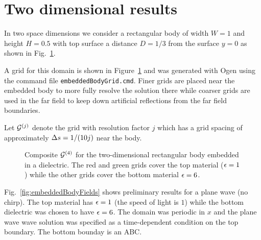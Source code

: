 \documentclass[11pt]{article}
\begin{document}
\clearpage
\section{Two dimensional results} \label{sec:twoDimensionalResults}


In two space dimensions we consider a rectangular body of width $W=1$ and height $H=0.5$ with
top surface a distance $D=1/3$ from the surface $y=0$ as shown in Fig.~\ref{fig:embeddedBodyGrid2d}. 

A grid for this domain is shown in Figure~\ref{fig:embeddedBodyGrid2d}
and was generated with Ogen using the command file {\tt embeddedBodyGrid.cmd}. 
Finer grids are placed near the embedded body to more fully resolve the solution there while
coarser grids are used in the far field to keep down artificial reflections from
the far field boundaries. 

Let ${\mathcal G}^{(j)}$ denote the grid with resolution factor $j$ which has a grid spacing of approximately $\Delta s=1/(10 j)$ near 
the body. 

{%
\newcommand{\figWidth}{7.5cm}
\newcommand{\trimfig}[2]{\trimFig{#1}{#2}{.0}{.0}{.0}{.0}}
\begin{figure}[htb]
\begin{center}
\end{center}
  \caption{Composite ${\mathcal G}^{(4)}$ for the two-dimensional rectangular body embedded in a dielectric. The red and
green grids cover the top material ($\epsilon=1$) while the other grids cover the bottom material $\epsilon=6$.}
  \label{fig:embeddedBodyGrid2d}
\end{figure}
}

Fig.~\ref{fig:embeddedBodyFields} shows preliminary results for a plane wave (no chirp). 
The top material has $\epsilon=1$ (the speed of light is $1$) while the bottom
dielectric was chosen to have $\epsilon=6$.  
The domain was periodic in $x$ and the plane wave wave solution was specified as a time-dependent
condition on the top boundary. The bottom bounday is an ABC. 
\end{document}
